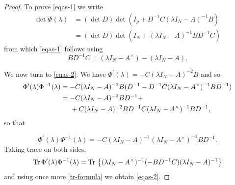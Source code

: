 \documentclass[12pt]{amsart}
\theoremstyle{definition}
\theoremstyle{remark}
\numberwithin{equation}{section}
\begin{document}
            \begin{proof}
To prove \eqref{eqas-1} we write
          \[
             \begin{split}
              \det\Phi({\lambda})&=(\det D)\det(I_p+D^{-1}{C}({\lambda}I_N-{A})^{-1}{B})\\
              &=(\det D)\det(I_N+({\lambda}I_N-{A})^{-1}{B}D^{-1} C)
              \end{split}
            \]
            from which  \eqref{eqas-1} follows using
\begin{equation}
                \label{tr-formula}
                BD^{-1}C=({\lambda}I_N-A^\times)-({\lambda}I_N-A).
                \end{equation}




         We now turn to \eqref{eqas-2}.     We have $\Phi^\prime({\lambda})=-C({\lambda}I_N-A)^{-2}B$ and so
              \[
                \begin{split}
                  \Phi^\prime({\lambda})\Phi^{-1}({\lambda})&=-C({\lambda}I_N-A)^{-2}B(D^{-1}-D^{-1}C({\lambda}I_N-A^\times)^{-1}BD^{-1})\\
                  &=-C({\lambda}I_N-A)^{-2}BD^{-1}+\\
                                                            &\hspace{5mm}+C({\lambda}I_N-A)^{-2}BD^{-1}C({\lambda}I_N-A^\times)^{-1}
                                                              BD^{-1},\\
                \end{split}
              \]
             so that

              \[
 \Phi^\prime({\lambda})\Phi^{-1}({\lambda})=-C({\lambda}I_N-A)^{-1}({\lambda}I_N-A^\times)^{-1}BD^{-1}.
\]
Taking trace on both sides,
\[
  {\rm Tr}\,                  \Phi^\prime({\lambda})\Phi^{-1}({\lambda})=
  {\rm Tr}\, \left\{({\lambda}I_N-A^\times)^{-1}(-BD^{-1}C)({\lambda}I_N-A)^{-1}\right\}
  \]
  and using once more \eqref{tr-formula} we obtain \eqref{eqas-2}.
  \end{proof}
\end{document}
